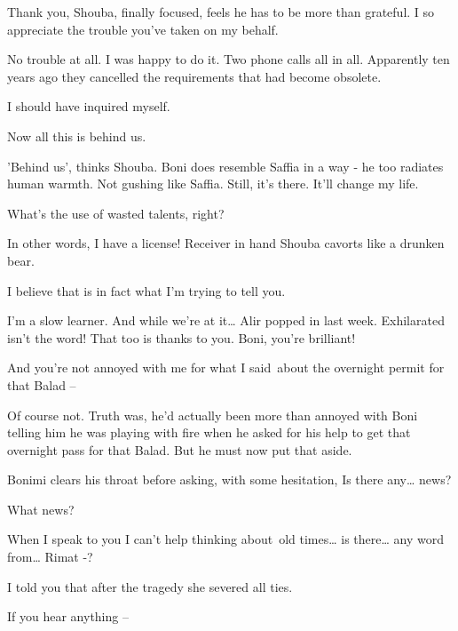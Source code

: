 \documentclass[letterpaper]{article}
\begin{document}
{\textquotedbl}Thank you,{\textquotedbl} Shouba, finally focused, feels he has to be more than grateful.
{\textquotedbl}I so appreciate the trouble you've taken on my behalf.{\textquotedbl} 

{\textquotedbl}No trouble at all. I was happy to do it. Two phone calls all in all. Apparently ten years ago they
cancelled the requirements that had become obsolete.{\textquotedbl} 

{\textquotedbl}I should have inquired myself.{\textquotedbl} 

{\textquotedbl}Now all this is behind us.{\textquotedbl} 

{}'Behind us', thinks Shouba. Boni does resemble Saffia in a way - he too radiates human warmth. Not gushing like
Saffia. Still, it's there. {\textquotedbl}It'll change my life.{\textquotedbl} 

{\textquotedbl}What's the use of wasted talents, right?{\textquotedbl} 

{\textquotedbl}In other words, I have a license!{\textquotedbl} Receiver in hand Shouba cavorts like a drunken bear. 

{\textquotedbl}I believe that is in fact what I'm trying to tell you.{\textquotedbl} 

{\textquotedbl}I'm a slow learner. And while we're at it{\dots} Alir popped in last week. Exhilarated isn't the word!
That too is thanks to you. Boni, you're brilliant!{\textquotedbl} 

{\textquotedbl}And you're not annoyed with me for what I said~about the overnight permit for that Balad
--{\textquotedbl} 

{\textquotedbl}Of course not.{\textquotedbl} Truth{ }was, he'd actually been more than annoyed with Boni
telling him he was playing with fire when he asked for his help to get that overnight pass for that{
}Balad. But he must now put that aside. 

Bonimi clears his throat before asking, with some hesitation, {\textquotedbl} Is there any{\dots} news?{\textquotedbl} 

{\textquotedbl}What news?{\textquotedbl} 

{\textquotedbl}When I speak to you I can't help thinking about~old times{\dots} is there{\dots} any word from{\dots}
Rimat -?{\textquotedbl} 

{\textquotedbl}I told you that after the tragedy she severed all ties.{\textquotedbl} 

{\textquotedbl}If you hear anything --{\textquotedbl} 
\end{document}
